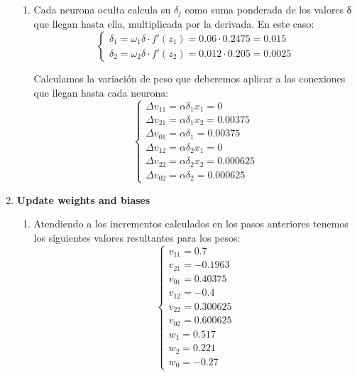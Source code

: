 \begin{problem}[1]
\begin{enumerate}
\begin{enumerate}
\item Cada neurona oculta calcula su $δ_j$ como suma ponderada de los valores δ que llegan hasta ella, multiplicada por la derivada. En este caso:
\[\left\{ \begin{array}{l}
δ_1= ω_1 δ \cdot f'(z_1)= 0.06 \cdot 0.2475 = 0.015\\
δ_2= ω_2 δ \cdot f'(z_2)= 0.012 \cdot 0.205 = 0.0025
\end{array}\right.\]

Calculamos la variación de peso que deberemos aplicar a las conexiones que llegan hasta cada neurona:
\[\left\{ \begin{array}{l}
Δv_{11}= αδ_1x_1 = 0 \\
Δv_{21}= αδ_1x_2 = 0.00375 \\
Δv_{01}= αδ_1 = 0.00375 \\
Δv_{12}= αδ_2x_1 = 0 \\
Δv_{22}= αδ_2x_2 = 0.000625 \\
Δv_{02}= αδ_2 = 0.000625
\end{array}\right.\]
\end{enumerate}
\item \textbf{Update weights and biases}
\begin{enumerate}
\item Atendiendo a los incrementos calculados en los pasos anteriores tenemos los siguientes valores resultantes para los pesos:
\[\left\{ \begin{array}{l}
v_{11} = 0.7 \\
v_{21} = -0.1963 \\
v_{01} = 0.40375 \\
v_{12} = -0.4 \\
v_{22} = 0.300625 \\
v_{02} = 0.600625 \\
w_1    = 0.517 \\
w_2    = 0.221 \\
w_0    = - 0.27
\end{array}\right.\]
\end{enumerate}
\end{enumerate}
\end{problem}

